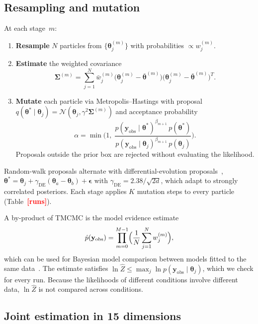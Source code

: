 \documentclass[11pt,a4paper]{article}
\newcommand{\btheta}{\boldsymbol{\theta}}
\newcommand{\yobs}{\mathbf{y}_{\mathrm{obs}}}
\newcommand{\TBD}[1]{\textcolor{red}{\textbf{[#1]}}}
\begin{document}
\subsection{Resampling and mutation}

At each stage~$m$:
\begin{enumerate}[nosep,leftmargin=*]
\item \textbf{Resample} $N$ particles from $\{\btheta_j^{(m)}\}$ with probabilities $\propto w_j^{(m)}$.
\item \textbf{Estimate} the weighted covariance
\begin{equation}
\boldsymbol{\Sigma}^{(m)}
= \sum_{j=1}^{N}\bar{w}_j^{(m)}
\bigl(\btheta_j^{(m)}-\bar{\btheta}^{(m)}\bigr)
\bigl(\btheta_j^{(m)}-\bar{\btheta}^{(m)}\bigr)^T.
\label{eq:cov}
\end{equation}
\item \textbf{Mutate} each particle via Metropolis--Hastings with proposal $q(\btheta^*\mid\btheta_j)=\mathcal{N}(\btheta_j,\gamma^2\boldsymbol{\Sigma}^{(m)})$ and acceptance probability
\begin{equation}
\alpha = \min\!\biggl(1,\;
\frac{p(\yobs\mid\btheta^*)^{\beta_{m+1}}\,p(\btheta^*)}
     {p(\yobs\mid\btheta_j)^{\beta_{m+1}}\,p(\btheta_j)}\biggr).
\label{eq:accept}
\end{equation}
Proposals outside the prior box are rejected without evaluating the likelihood.
\end{enumerate}
Random-walk proposals alternate with differential-evolution proposals~\cite{terBraak2006DEMC}, $\btheta^*=\btheta_j+\gamma_{\mathrm{DE}}(\btheta_a-\btheta_b)+\boldsymbol{\epsilon}$ with $\gamma_{\mathrm{DE}}=2.38/\sqrt{2d}$, which adapt to strongly correlated posteriors.
Each stage applies $K$ mutation steps to every particle (Table~\TBD{runs}).

A by-product of TMCMC is the model evidence estimate
\begin{equation}
\hat{p}(\yobs) = \prod_{m=0}^{M-1}\Bigl(\frac{1}{N}\sum_{j=1}^{N}w_j^{(m)}\Bigr),
\label{eq:evidence}
\end{equation}
which can be used for Bayesian model comparison between models fitted to the same data~\cite{KassRaftery1995BayesFactor}.
The estimate satisfies $\ln\hat{Z}\le\max_j\ln p(\yobs\mid\btheta_j)$, which we check for every run.
Because the likelihoods of different conditions involve different data, $\ln\hat{Z}$ is not compared across conditions.

\subsection{Joint estimation in 15 dimensions}
\end{document}
